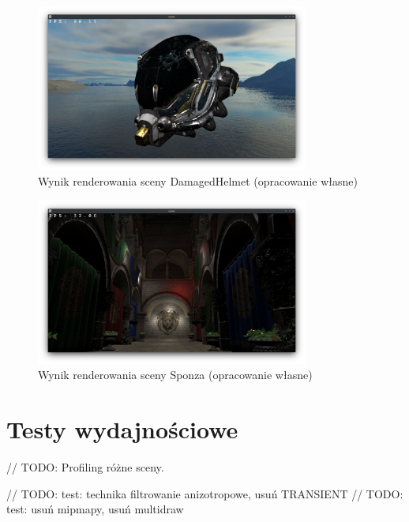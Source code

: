 \begin{figure}[!htb]
	\centering
	\includegraphics[width=0.8\textwidth]{images/render_damagedhelmet.png}
	\caption{Wynik renderowania sceny DamagedHelmet (opracowanie własne)}
	\label{screenshot_damagedhelmet}
\end{figure}

\begin{figure}[!htb]
	\centering
	\includegraphics[width=0.8\textwidth]{images/render_sponza.png}
	\caption{Wynik renderowania sceny Sponza (opracowanie własne)}
	\label{screenshot_sponza}
\end{figure}

\section{Testy wydajnościowe}

// TODO: Profiling różne sceny.

// TODO: test: technika filtrowanie anizotropowe, usuń TRANSIENT
// TODO: test: usuń mipmapy, usuń multidraw
